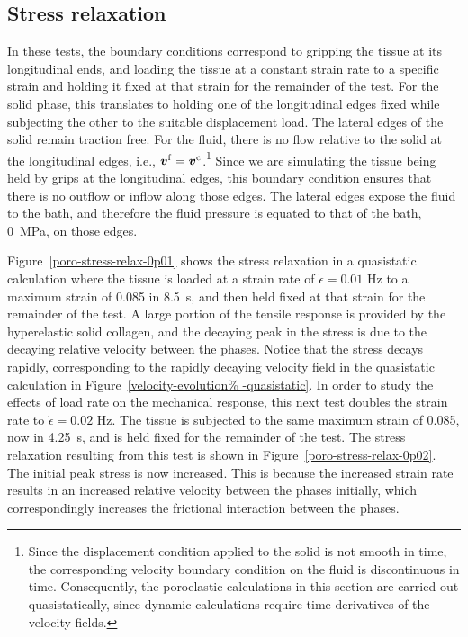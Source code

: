 \subsection{Stress relaxation}
\label{stress-relaxation}

In these tests, the boundary conditions correspond to gripping the
tissue at its longitudinal ends, and loading the tissue at a constant
strain rate to a specific strain and holding it fixed at that strain
for the remainder of the test. For the solid phase, this translates to holding one of the
longitudinal edges fixed while subjecting the other to the suitable
displacement load. The lateral edges of the solid remain traction
free. For the fluid, there is no flow relative to the solid at the
longitudinal edges, i.e., $\mbox{\boldmath$ v$}^{\mathrm{f}} =
\mbox{\boldmath$ v$}^{\mathrm{c}}$.\footnote{Since the displacement condition applied
  to the solid is not smooth in time, the corresponding velocity
  boundary condition on the fluid is discontinuous in
  time. Consequently, the poroelastic calculations in this section are
  carried out quasistatically, since dynamic calculations require time
  derivatives of the velocity fields.} Since we are simulating the
tissue being held by grips at the longitudinal edges, this boundary
condition ensures that there is no outflow or inflow along those
edges. The lateral edges expose the fluid to the bath, and therefore
the fluid pressure is equated to that of the bath, 0~MPa, on those
edges.

Figure~\ref{poro-stress-relax-0p01} shows the stress relaxation in a
quasistatic calculation where the tissue is loaded at a strain rate of
$\dot{\epsilon}=0.01$ Hz to a maximum strain of 0.085 in 8.5~s, and
then held fixed at that strain for the remainder of the test. A large
portion of the tensile response is provided by the hyperelastic solid
collagen, and the decaying peak in the stress is due to the decaying
relative velocity between the phases. Notice that the stress decays
rapidly, corresponding to the rapidly decaying velocity field in the
quasistatic calculation in Figure~\ref{velocity-evolution%
  -quasistatic}. In order to study the effects of load rate on the mechanical response,
this next test doubles the strain rate to $\dot{\epsilon}=0.02$
Hz. The tissue is subjected to the same maximum strain of 0.085, now
in 4.25~s, and is held fixed for the remainder of the test. The stress
relaxation resulting from this test is shown in
Figure~\ref{poro-stress-relax-0p02}. The initial peak stress is now
increased. This is because the increased strain rate results in an
increased relative velocity between the phases initially, which
correspondingly increases the frictional interaction between the
phases.

